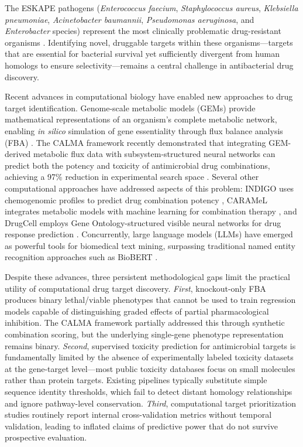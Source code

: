\documentclass[12pt,a4paper]{article}
\begin{document}
The ESKAPE pathogens (\textit{Enterococcus faecium}, \textit{Staphylococcus aureus}, \textit{Klebsiella pneumoniae}, \textit{Acinetobacter baumannii}, \textit{Pseudomonas aeruginosa}, and \textit{Enterobacter} species) represent the most clinically problematic drug-resistant organisms \citep{rice2008}. Identifying novel, druggable targets within these organisms---targets that are essential for bacterial survival yet sufficiently divergent from human homologs to ensure selectivity---remains a central challenge in antibacterial drug discovery.

Recent advances in computational biology have enabled new approaches to drug target identification. Genome-scale metabolic models (GEMs) provide mathematical representations of an organism's complete metabolic network, enabling \textit{in silico} simulation of gene essentiality through flux balance analysis (FBA) \citep{orth2010}. The CALMA framework recently demonstrated that integrating GEM-derived metabolic flux data with subsystem-structured neural networks can predict both the potency and toxicity of antimicrobial drug combinations, achieving a 97\% reduction in experimental search space \citep{arora2026}. Several other computational approaches have addressed aspects of this problem: INDIGO uses chemogenomic profiles to predict drug combination potency \citep{chandrasekaran2016}, CARAMeL integrates metabolic models with machine learning for combination therapy \citep{ji2023}, and DrugCell employs Gene Ontology-structured visible neural networks for drug response prediction \citep{kuenzi2020}. Concurrently, large language models (LLMs) have emerged as powerful tools for biomedical text mining, surpassing traditional named entity recognition approaches such as BioBERT \citep{lee2020, gu2022}.

Despite these advances, three persistent methodological gaps limit the practical utility of computational drug target discovery. \textit{First}, knockout-only FBA produces binary lethal/viable phenotypes that cannot be used to train regression models capable of distinguishing graded effects of partial pharmacological inhibition. The CALMA framework partially addressed this through synthetic combination scoring, but the underlying single-gene phenotype representation remains binary. \textit{Second}, supervised toxicity prediction for antimicrobial targets is fundamentally limited by the absence of experimentally labeled toxicity datasets at the gene-target level---most public toxicity databases focus on small molecules rather than protein targets. Existing pipelines typically substitute simple sequence identity thresholds, which fail to detect distant homology relationships and ignore pathway-level conservation. \textit{Third}, computational target prioritization studies routinely report internal cross-validation metrics without temporal validation, leading to inflated claims of predictive power that do not survive prospective evaluation.
\end{document}

